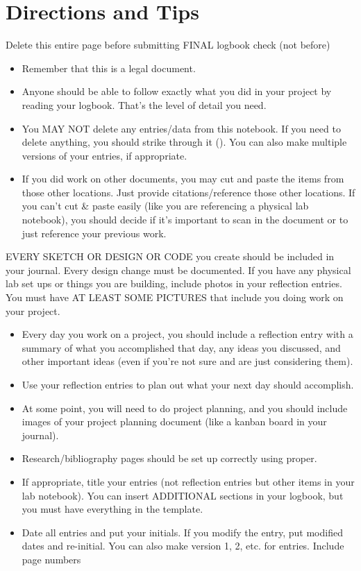 \part{Directions and Tips}

Delete this entire page before submitting FINAL logbook check (not before)

\begin{itemize}
    \item Remember that this is a legal document.
    \item Anyone should be able to follow exactly what you did in your project
          by reading your logbook. That's the level of detail you need.
    \item You MAY NOT delete any entries/data from this notebook. If you need to
          delete anything, you should strike through it (). You can also make multiple versions of your entries,
          if appropriate.
    \item If you did work on other documents, you may cut and paste the items
          from those other locations. Just provide citations/reference those
          other locations. If you can't cut \& paste easily (like you are
          referencing a physical lab notebook), you should decide if it's
          important to scan in the document or to just reference your previous
          work.
\end{itemize}

EVERY SKETCH OR DESIGN OR CODE you create should be included in your journal.
Every design change must be documented. If you have any physical lab set ups or
things you are building, include photos in your reflection entries. You must
have AT LEAST SOME PICTURES that include you doing work on your project.

\begin{itemize}
    \item Every day you work on a project, you should include a reflection entry
          with a summary of what you accomplished that day, any ideas you
          discussed, and other important ideas (even if you're not sure and are
          just considering them).
    \item Use your reflection entries to plan out what your next day should
          accomplish.
    \item At some point, you will need to do project planning, and you should
          include images of your project planning document (like a kanban board
          in your journal).
    \item Research/bibliography pages should be set up correctly using proper.
    \item If appropriate, title your entries (not reflection entries but other
          items in your lab notebook). You can insert ADDITIONAL sections in
          your logbook, but you must have everything in the template.
    \item Date all entries and put your initials. If you modify the entry, put
          modified dates and re-initial. You can also make version 1, 2, etc.\@
          for entries. Include page numbers
\end{itemize}
